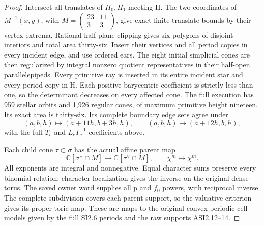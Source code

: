 \begin{proof}
Intersect all translates of \(H_0,H_1\) meeting H.  The two coordinates of
\(M^{-1}(x,y)\), with
\(M=\left(\begin{smallmatrix}23&11\\3&3\end{smallmatrix}\right)\),
give exact finite translate bounds
by their vertex extrema.  Rational half-plane clipping gives six polygons
of disjoint interiors and total area thirty-six.  Insert their vertices and
all period copies in every incident edge, and use ordered ears.  The eight
initial simplicial cones are then regularized by integral nonzero quotient
representatives in their half-open parallelepipeds.  Every primitive ray is
inserted in its entire incident star and every period copy in H.  Each
positive barycentric coefficient is strictly less than one, so the
determinant decreases on every affected cone.  The full execution has 959
stellar orbits and 1,926 regular cones, of maximum primitive height nineteen.
Its exact area is thirty-six.  Its complete boundary edge sets agree under
\[
(a,b,h)\mapsto(a+11h,b+3h,h),\qquad
(a,b,h)\mapsto(a+12h,b,h),
\]
with the full \(T_c\) and \(L_cT_c^{-1}\) coefficients above.

Each child cone \(\tau\subset\sigma\) has the actual affine parent map
\[
 \mathbb C[\sigma^\vee\cap M]\longrightarrow
 \mathbb C[\tau^\vee\cap M],\qquad\chi^m\longmapsto\chi^m.
\]
All exponents are integral and nonnegative.  Equal character sums preserve
every binomial relation; character localization gives the inverse on the
original dense torus.  The saved owner word supplies all p and \(f_0\)
powers, with reciprocal inverse.  The complete subdivision covers each
parent support, so the valuative criterion gives its proper toric map.
These are maps to the original convex periodic cell models given by the
full SI2.6 periods and the raw supports ASI2.12--14.


\end{proof}
